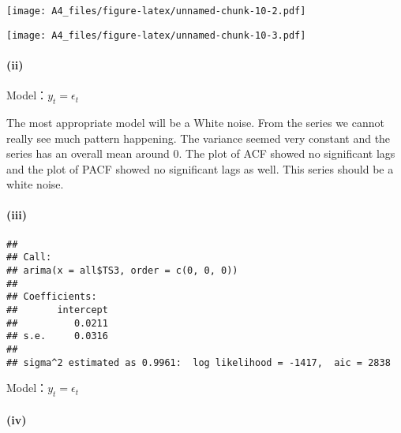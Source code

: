 \documentclass[]{article}
\newenvironment{Shaded}{\begin{snugshade}}{\end{snugshade}}
\newcommand{\DataTypeTok}[1]{\textcolor[rgb]{0.13,0.29,0.53}{#1}}
\newcommand{\DecValTok}[1]{\textcolor[rgb]{0.00,0.00,0.81}{#1}}
\newcommand{\KeywordTok}[1]{\textcolor[rgb]{0.13,0.29,0.53}{\textbf{#1}}}
\newcommand{\NormalTok}[1]{#1}
\newcommand{\OperatorTok}[1]{\textcolor[rgb]{0.81,0.36,0.00}{\textbf{#1}}}
\newcommand{\StringTok}[1]{\textcolor[rgb]{0.31,0.60,0.02}{#1}}
\let\oldparagraph\paragraph
\renewcommand{\paragraph}[1]{\oldparagraph{#1}\mbox{}}
\begin{document}
\texttt{[image: A4\_files/figure-latex/unnamed-chunk-10-2.pdf]}

\begin{Shaded}
\end{Shaded}

\texttt{[image: A4\_files/figure-latex/unnamed-chunk-10-3.pdf]}

\hypertarget{ii-2}{%
\paragraph{(ii)}\label{ii-2}}

Model：\(y_t = \epsilon_t\)

The most appropriate model will be a White noise. From the series we
cannot really see much pattern happening. The variance seemed very
constant and the series has an overall mean around 0. The plot of ACF
showed no significant lags and the plot of PACF showed no significant
lags as well. This series should be a white noise.

\hypertarget{iii-2}{%
\paragraph{(iii)}\label{iii-2}}

\begin{Shaded}
\end{Shaded}

\begin{verbatim}
## 
## Call:
## arima(x = all$TS3, order = c(0, 0, 0))
## 
## Coefficients:
##       intercept
##          0.0211
## s.e.     0.0316
## 
## sigma^2 estimated as 0.9961:  log likelihood = -1417,  aic = 2838
\end{verbatim}

Model：\(y_t = \epsilon_t\)

\hypertarget{iv-2}{%
\paragraph{(iv)}\label{iv-2}}
\end{document}
